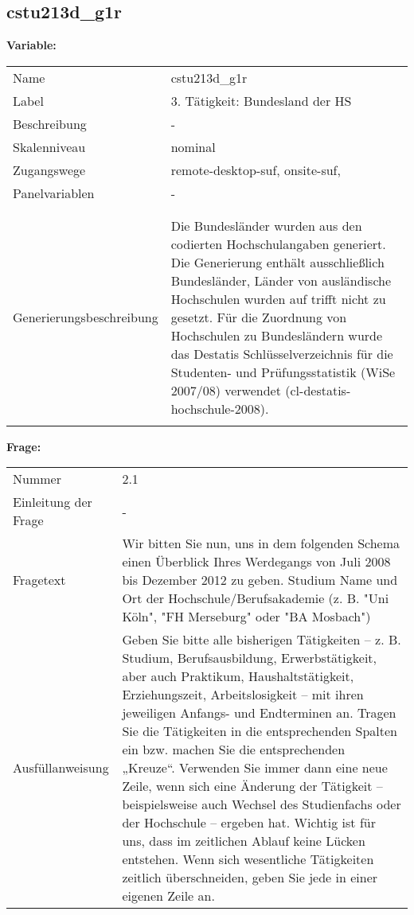 	
	
	\subsection{cstu213d\_g1r}
	\label{subSection:cstu213d_g1r}

	\noindent\textbf{Variable:}\\
		\begin{tabular}{lL{11.3cm}}
			\label{tableVariable:cstu213d_g1r}
			Name & cstu213d\_g1r \\
			Label & 3. Tätigkeit: Bundesland der HS \\
			Beschreibung & - \\
			Skalenniveau & nominal \\
			Zugangswege &
				remote-desktop-suf,
				onsite-suf,
 \\
			Panelvariablen & -
			 \\
			 \\
 \\
					Generierungsbeschreibung & Die Bundesländer wurden aus den codierten Hochschulangaben generiert. Die Generierung enthält ausschließlich Bundesländer, Länder von ausländische Hochschulen wurden auf trifft nicht zu gesetzt. Für die Zuordnung von Hochschulen zu Bundesländern wurde das Destatis Schlüsselverzeichnis für die Studenten- und Prüfungsstatistik (WiSe 2007/08) verwendet (cl-destatis-hochschule-2008).
				 \\	
			 \\
		\end{tabular}

		\vspace*{1 cm}
		\noindent\textbf{Frage:}\\
		\begin{tabular}{lL{11.3cm}}
			\label{tableQuestion:cstu213d_g1r}
			Nummer & 2.1 \\
			Einleitung der Frage & - \\
			Fragetext & Wir bitten Sie nun, uns in dem folgenden Schema einen Überblick Ihres Werdegangs von Juli 2008 bis Dezember 2012 zu geben.
Studium
Name und Ort der Hochschule/Berufsakademie
(z. B. "Uni Köln", "FH Merseburg" oder "BA Mosbach") \\
			Ausfüllanweisung & Geben Sie bitte alle bisherigen Tätigkeiten – z. B. Studium, Berufsausbildung, Erwerbstätigkeit, aber auch Praktikum, Haushaltstätigkeit,
Erziehungszeit, Arbeitslosigkeit – mit ihren jeweiligen Anfangs- und Endterminen an. Tragen Sie die Tätigkeiten in die entsprechenden Spalten ein bzw. machen Sie die entsprechenden „Kreuze“. Verwenden Sie immer dann eine neue Zeile, wenn sich eine Änderung der Tätigkeit – beispielsweise auch Wechsel des Studienfachs oder der Hochschule – ergeben hat. Wichtig ist für uns, dass im zeitlichen Ablauf keine Lücken entstehen. Wenn sich wesentliche Tätigkeiten zeitlich überschneiden, geben Sie jede in einer eigenen Zeile an. \\
		\end{tabular}





